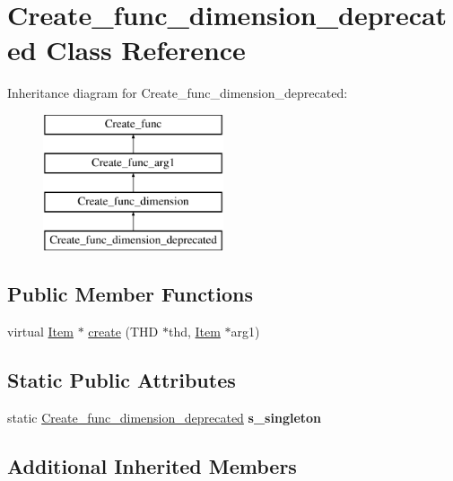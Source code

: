 \hypertarget{classCreate__func__dimension__deprecated}{}\section{Create\+\_\+func\+\_\+dimension\+\_\+deprecated Class Reference}
\label{classCreate__func__dimension__deprecated}
Inheritance diagram for Create\+\_\+func\+\_\+dimension\+\_\+deprecated\+:\begin{figure}[H]
\begin{center}
\leavevmode
\includegraphics[height=4.000000cm]{classCreate__func__dimension__deprecated}
\end{center}
\end{figure}
\subsection*{Public Member Functions}
\begin{DoxyCompactItemize}
\item 
virtual \mbox{\hyperlink{classItem}{Item}} $\ast$ \mbox{\hyperlink{classCreate__func__dimension__deprecated_af75eca8b756e87b951297f98a20017c6}{create}} (T\+HD $\ast$thd, \mbox{\hyperlink{classItem}{Item}} $\ast$arg1)
\end{DoxyCompactItemize}
\subsection*{Static Public Attributes}
\begin{DoxyCompactItemize}
\item 
\mbox{\label{classCreate__func__dimension__deprecated_a42d414d903bc3595897b0e41c4d53e73}} 
static \mbox{\hyperlink{classCreate__func__dimension__deprecated}{Create\+\_\+func\+\_\+dimension\+\_\+deprecated}} {\bfseries s\+\_\+singleton}
\end{DoxyCompactItemize}
\subsection*{Additional Inherited Members}


